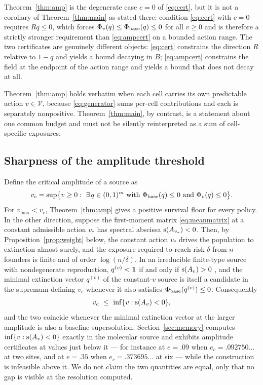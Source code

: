 \begin{remark}\label{rem:ampvsexp}
Theorem~\ref{thm:amp} is the degenerate case $c=0$ of \eqref{eq:cert}, but it is
not a corollary of Theorem~\ref{thm:main} as stated there: condition
\eqref{eq:cert} with $c=0$ requires $Rq\le0$, which forces
$\Phi_v(q)\le\Phi_{\mathrm{base}}(q)\le0$ for all $v\ge0$ and is therefore a strictly stronger
requirement than \eqref{eq:ampcert} on a bounded action range. The two
certificates are genuinely different objects: \eqref{eq:cert} constrains the
direction $R$ relative to $1-q$ and yields a bound decaying in $B$;
\eqref{eq:ampcert} constrains the field at the endpoint of the action range and
yields a bound that does not decay at all.
\end{remark}

\begin{remark}\label{rem:cellwise}
Theorem~\ref{thm:amp} holds verbatim when each cell carries its own predictable
action $v\in\mathcal V$, because \eqref{eq:generator} sums per-cell contributions
and each is separately nonpositive. Theorem~\ref{thm:main}, by contrast, is a
statement about one common budget and must not be silently reinterpreted as a
sum of cell-specific exposures.
\end{remark}

\subsection{Sharpness of the amplitude threshold}
\label{sec:ampsharp}

Define the critical amplitude of a source as
\[
 v_c=\sup\bigl\{v\ge0:\ \exists\,q\in(0,1)^m\ \text{with}\
      \PhiB(q)\le0\ \text{and}\ \Phi_{v}(q)\le0\bigr\}.
\]
For $v_{\max}<v_c$, Theorem~\ref{thm:amp} gives a positive survival floor for
every policy. In the other direction, suppose the first-moment matrix
\eqref{eq:meanmatrix} at a constant admissible action $v_*$ has spectral
abscissa $\operatorname{s}(A_{v_*})<0$.
Then, by Proposition~\ref{prop:weight} below, the constant action $v_*$ drives
the population to extinction almost surely, and the exposure required to reach
risk $\delta$ from $n$ founders is finite and of order $\log(n/\delta)$. In an
irreducible finite-type source with nondegenerate reproduction, $q^{(v)}<\mathbf1$
if and only if $\operatorname{s}(A_v)>0$ \citep{athreya1972,kimmel2015}, and the minimal
extinction vector $q^{(v)}$ of the constant-$v$ source is itself a candidate in
the supremum defining $v_c$ whenever it also satisfies $\Phi_{\mathrm{base}}(q^{(v)})\le0$.
Consequently
\[
 v_c\ \le\ \inf\{v:\operatorname{s}(A_v)<0\},
\]
and the two coincide whenever the minimal extinction vector at the larger
amplitude is also a baseline supersolution. Section~\ref{sec:memory} computes
$\inf\{v:\operatorname{s}(A_v)<0\}$ exactly in the molecular source and exhibits amplitude
certificates at values just below it --- for instance at $e=.09$ when
$e_c=.092750\ldots$ at two sites, and at $e=.35$ when $e_c=.373695\ldots$ at
six --- while the construction is infeasible above it. We do not claim the two
quantities are equal, only that no gap is visible at the resolution computed.

